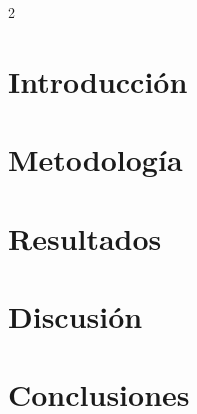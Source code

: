 \documentclass{article}
\begin{document}



\begin{multicols}{2}
\section*{Introducción}


\section*{Metodolog\'ia}


\section*{Resultados}


\section*{Discusi\'on}


\section*{Conclusiones}



\end{multicols}
\end{document}
